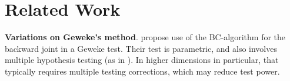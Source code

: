 \documentclass{article}
\begin{document}
\section{Related Work}
\label{related:work}
 
{\noindent\bf Variations on Geweke's method}. \citet{gandy_unit_2020} propose use of the BC-algorithm for the backward joint in a Geweke test.
Their test is parametric, and also involves multiple hypothesis testing (as in \cite{geweke_getting_2004}). In higher dimensions in particular,
that typically requires multiple testing corrections, which may reduce test power.
\end{document}
